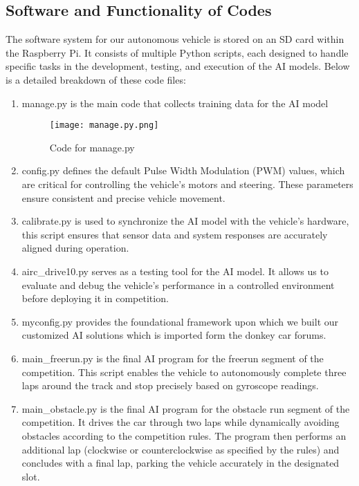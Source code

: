 \documentclass{article}
\begin{document}
\begin{multicols}{2}
\section{Software and Functionality of Codes}

The software system for our autonomous vehicle is stored on an SD card within the Raspberry Pi. It consists of multiple Python scripts, each designed to handle specific tasks in the development, testing, and execution of the AI models. Below is a detailed breakdown of these code files:

\begin{enumerate}
    \item manage.py is the main code that collects training data for the AI model

    \begin{figure}[H]
            \centering         \texttt{[image: manage.py.png]}
            \caption*{Code for manage.py}
    \end{figure}

    \item config.py defines the default Pulse Width Modulation (PWM) values, which are critical for controlling the vehicle's motors and steering. These parameters ensure consistent and precise vehicle movement.
    \item calibrate.py is used to synchronize the AI model with the vehicle’s hardware, this script ensures that sensor data and system responses are accurately aligned during operation.
    \item airc\_drive10.py serves as a testing tool for the AI model. It allows us to evaluate and debug the vehicle's performance in a controlled environment before deploying it in competition.
    \item myconfig.py provides the foundational framework upon which we built our customized AI solutions which is imported form the donkey car forums.
    \item main\_freerun.py is the final AI program for the freerun segment of the competition. This script enables the vehicle to autonomously complete three laps around the track and stop precisely based on gyroscope readings.
    \item main\_obstacle.py is the final AI program for the obstacle run segment of the competition. It drives the car through two laps while dynamically avoiding obstacles according to the competition rules. The program then performs an additional lap (clockwise or counterclockwise as specified by the rules) and concludes with a final lap, parking the vehicle accurately in the designated slot.
\end{enumerate}


\end{multicols}
\end{document}
